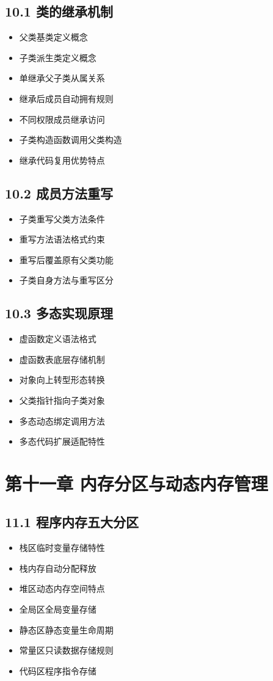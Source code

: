 \subsection{10.1 类的继承机制}
\begin{itemize}
\item 父类基类定义概念
\item 子类派生类定义概念
\item 单继承父子类从属关系
\item 继承后成员自动拥有规则
\item 不同权限成员继承访问
\item 子类构造函数调用父类构造
\item 继承代码复用优势特点
\end{itemize}

\subsection{10.2 成员方法重写}
\begin{itemize}
\item 子类重写父类方法条件
\item 重写方法语法格式约束
\item 重写后覆盖原有父类功能
\item 子类自身方法与重写区分
\end{itemize}

\subsection{10.3 多态实现原理}
\begin{itemize}
\item 虚函数定义语法格式
\item 虚函数表底层存储机制
\item 对象向上转型形态转换
\item 父类指针指向子类对象
\item 多态动态绑定调用方法
\item 多态代码扩展适配特性
\end{itemize}

\section{第十一章 内存分区与动态内存管理}
\subsection{11.1 程序内存五大分区}
\begin{itemize}
\item 栈区临时变量存储特性
\item 栈内存自动分配释放
\item 堆区动态内存空间特点
\item 全局区全局变量存储
\item 静态区静态变量生命周期
\item 常量区只读数据存储规则
\item 代码区程序指令存储
\end{itemize}

